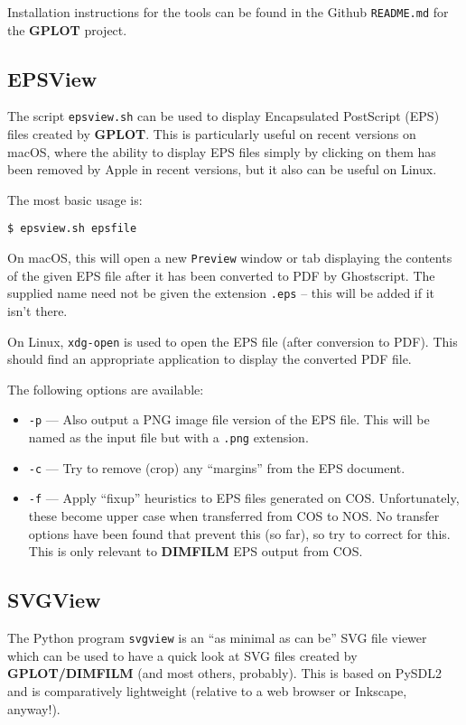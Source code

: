 \documentclass[a4paper,twoside,11pt]{article}
\newcommand{\newpara}{\par\vspace{4mm}\noindent}
\newcommand{\textttc}[1]{\texttt{\textcolor{OurRed}{#1}}}
\begin{document}
\newpara
Installation instructions for the tools can be found in the Github \texttt{README.md} for the \textbf{GPLOT} project.

\subsection{EPSView}
\newpara
The script \texttt{epsview.sh} can be used to display Encapsulated PostScript (EPS) files created by
\textbf{GPLOT}. This is particularly
useful on recent versions on macOS, where the ability to display EPS files simply by clicking on them has been removed
by Apple in recent versions, but it also can be useful on Linux.

\newpara
The most basic usage is:
\begin{lstlisting}
$ epsview.sh epsfile
\end{lstlisting}
On macOS, this will open a new \texttt{Preview} window or tab displaying the contents of the given EPS file after
it has been converted to PDF by Ghostscript. The supplied
name need not be given the extension \texttt{.eps} -- this will be added if it isn't there.

\newpara
On Linux, \texttt{xdg-open} is used to open the EPS file (after conversion to PDF). This should find an
appropriate application to display the converted PDF file.

\newpara
The following options are available:
\begin{itemize}
\item \textttc{-p} --- Also output a PNG image file version of the EPS file.
  This will be named as the input file but with a \texttt{.png}
  extension.
\item \textttc{-c} --- Try to remove (crop) any ``margins'' from the EPS document.
\item \textttc{-f} --- Apply ``fixup'' heuristics to EPS files generated on COS.
  Unfortunately, these become upper case when transferred from COS to NOS. No transfer options
  have been found that prevent this (so far), so try to correct for this. This is only relevant
  to \textbf{DIMFILM} EPS output from COS.
\end{itemize}

\subsection{SVGView}
\newpara
The Python program \texttt{svgview} is an ``as minimal as can be'' SVG file viewer which can be used to
have a quick look at SVG files created by \textbf{GPLOT/DIMFILM} (and most others, probably). This
is based on PySDL2 and is comparatively lightweight (relative to a web browser or Inkscape,
anyway!).
\end{document}
